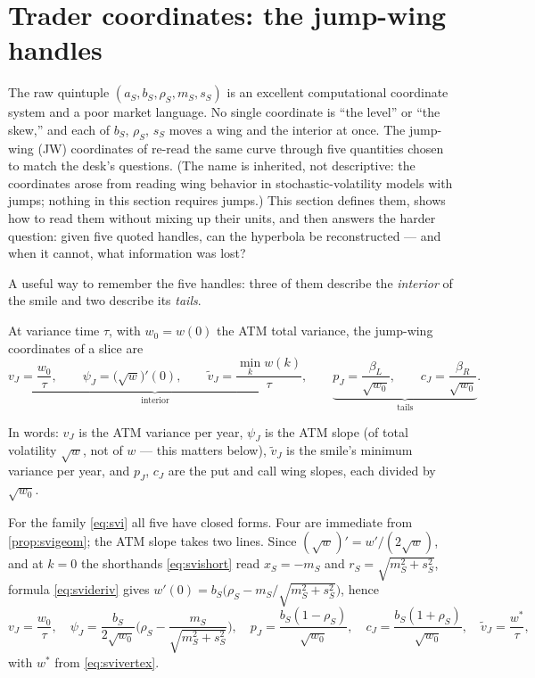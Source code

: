 \section{Trader coordinates: the jump-wing handles}
\label{sec:svijw}

The raw quintuple $(a_S,b_S,\rho_S,m_S,s_S)$ is an excellent
computational coordinate system and a poor market language.  No single
coordinate is ``the level'' or ``the skew,'' and each of $b_S$,
$\rho_S$, $s_S$ moves a wing and the interior at once.  The jump-wing
(JW) coordinates of \citet{GatheralJacquier2014} re-read the same curve
through five quantities chosen to match the desk's questions.  (The
name is inherited, not descriptive: the coordinates arose from reading
wing behavior in stochastic-volatility models with jumps; nothing in
this section requires jumps.)  This
section defines them, shows how to read them without mixing up their
units, and then answers the harder question: given five quoted handles,
can the hyperbola be reconstructed --- and when it cannot, what
information was lost?

A useful way to remember the five handles: three of them describe the
\emph{interior} of the smile and two describe its \emph{tails}.

\begin{definition}
\label{def:jw}
At variance time $\tau$, with $w_0=w(0)$ the ATM total variance, the
jump-wing coordinates of a slice are
\begin{equation}
\underbrace{v_J=\frac{w_0}{\tau},\qquad
\psi_J=\big(\sqrt{w}\big)'(0),\qquad
\tilde v_J=\frac{\min_k w(k)}{\tau}}_{\text{interior}},
\qquad
\underbrace{p_J=\frac{\beta_L}{\sqrt{w_0}},\qquad
c_J=\frac{\beta_R}{\sqrt{w_0}}}_{\text{tails}}.
\label{eq:jwdef}
\end{equation}
\end{definition}

In words: $v_J$ is the ATM variance per year, $\psi_J$ is the ATM slope
(of total volatility $\sqrt w$, not of $w$ --- this matters below),
$\tilde v_J$ is the smile's minimum variance per year, and $p_J$, $c_J$
are the put and call wing slopes, each divided by $\sqrt{w_0}$.

For the family \eqref{eq:svi} all five have closed forms.  Four are
immediate from \cref{prop:svigeom}; the ATM slope takes two lines.
Since $(\sqrt w)'=w'/(2\sqrt w)$, and at $k=0$ the shorthands
\eqref{eq:svishort} read $x_S=-m_S$ and $r_S=\sqrt{m_S^2+s_S^2}$,
formula \eqref{eq:svideriv} gives
$w'(0)=b_S\big(\rho_S-m_S/\sqrt{m_S^2+s_S^2}\big)$, hence
\begin{equation}
v_J=\frac{w_0}{\tau},\quad
\psi_J=\frac{b_S}{2\sqrt{w_0}}\Big(\rho_S-\frac{m_S}{\sqrt{m_S^2+s_S^2}}\Big),\quad
p_J=\frac{b_S(1-\rho_S)}{\sqrt{w_0}},\quad
c_J=\frac{b_S(1+\rho_S)}{\sqrt{w_0}},\quad
\tilde v_J=\frac{w^*}{\tau},
\label{eq:rawtojw}
\end{equation}
with $w^*$ from \eqref{eq:svivertex}.

